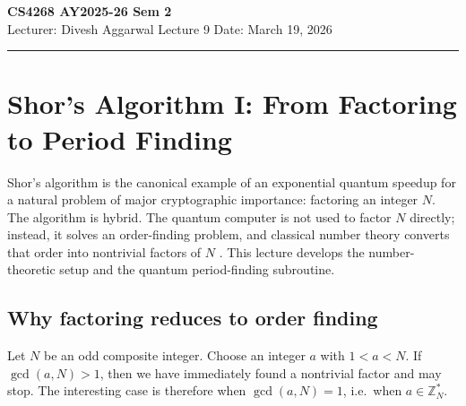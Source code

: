 



% 


\newpage
\noindent
\textbf{CS4268 AY2025-26 Sem 2}
\\
\noindent
Lecturer: Divesh Aggarwal
\hfill
Lecture 9                      %
\hfill
Date: March 19, 2026          %


\noindent
\rule{\textwidth}{1pt}

\medskip


\section{Shor's Algorithm I: From Factoring to Period Finding}

Shor's algorithm is the canonical example of an exponential quantum speedup for a natural problem of major cryptographic importance: factoring an integer $N$. The algorithm is hybrid. The quantum computer is not used to factor $N$ directly; instead, it solves an order-finding problem, and classical number theory converts that order into nontrivial factors of $N$ \cite{NC10}. This lecture develops the number-theoretic setup and the quantum period-finding subroutine.

\subsection{Why factoring reduces to order finding}

Let $N$ be an odd composite integer. Choose an integer $a$ with $1 < a < N$. If $\gcd(a,N) > 1$, then we have immediately found a nontrivial factor and may stop. The interesting case is therefore when $\gcd(a,N)=1$, i.e.\ when $a \in \mathbb{Z}_N^*$.

